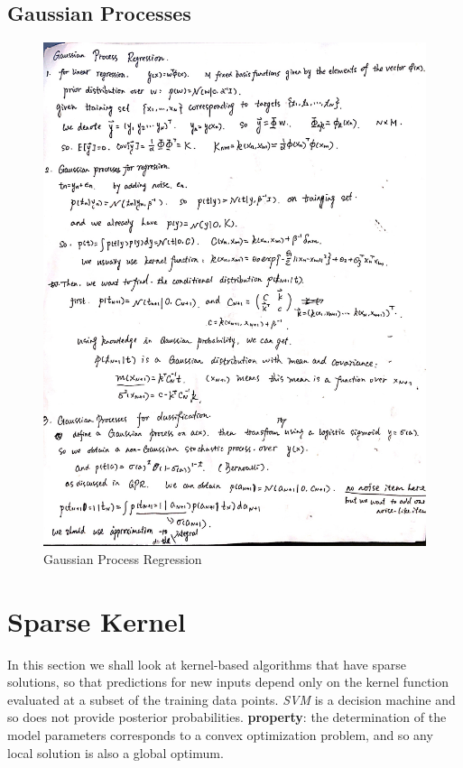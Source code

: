 \documentclass[a4paper]{book}
\begin{document}
\subsection{Gaussian Processes}
\begin{figure}
  \centering
  \includegraphics[width=\textwidth]{./imgs/GPR.jpg}
  \caption{Gaussian Process Regression}\label{fig3.5.1}
\end{figure}


\section{Sparse Kernel}
In this section we shall look at kernel-based algorithms that have sparse solutions, so that predictions for new inputs depend only on the kernel function evaluated at a subset of the training data points.\newline
\textit{SVM} is a decision machine and so does not provide posterior probabilities.
\textbf{property}: the  determination of the model parameters corresponds to a convex optimization problem, and so any local solution is also a global optimum.
\end{document}
